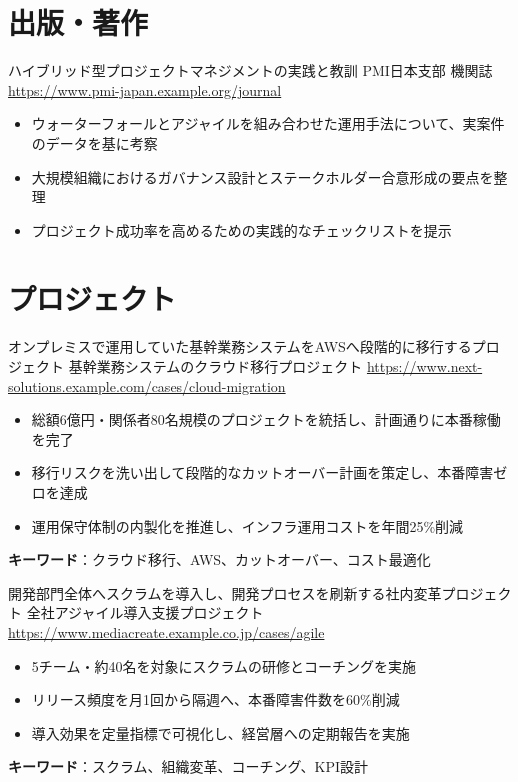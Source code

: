 \documentclass[a4paper, serif, 10pt]{moderncv}
\begin{document}
\section{出版・著作}

        {ハイブリッド型プロジェクトマネジメントの実践と教訓}
        {PMI日本支部 機関誌}
        {\url{https://www.pmi-japan.example.org/journal}}
        {}
        {\begin{itemize}
\item ウォーターフォールとアジャイルを組み合わせた運用手法について、実案件のデータを基に考察
\item 大規模組織におけるガバナンス設計とステークホルダー合意形成の要点を整理
\item プロジェクト成功率を高めるための実践的なチェックリストを提示
\end{itemize}}
\section{プロジェクト}

        {オンプレミスで運用していた基幹業務システムをAWSへ段階的に移行するプロジェクト}
        {基幹業務システムのクラウド移行プロジェクト}
        {\url{https://www.next-solutions.example.com/cases/cloud-migration}}
        {}
        {\begin{itemize}
\item 総額6億円・関係者80名規模のプロジェクトを統括し、計画通りに本番稼働を完了
\item 移行リスクを洗い出して段階的なカットオーバー計画を策定し、本番障害ゼロを達成
\item 運用保守体制の内製化を推進し、インフラ運用コストを年間25\%削減
\end{itemize}
\textbf{キーワード}：クラウド移行、AWS、カットオーバー、コスト最適化}

        {開発部門全体へスクラムを導入し、開発プロセスを刷新する社内変革プロジェクト}
        {全社アジャイル導入支援プロジェクト}
        {\url{https://www.mediacreate.example.co.jp/cases/agile}}
        {}
        {\begin{itemize}
\item 5チーム・約40名を対象にスクラムの研修とコーチングを実施
\item リリース頻度を月1回から隔週へ、本番障害件数を60\%削減
\item 導入効果を定量指標で可視化し、経営層への定期報告を実施
\end{itemize}
\textbf{キーワード}：スクラム、組織変革、コーチング、KPI設計}
\end{document}
